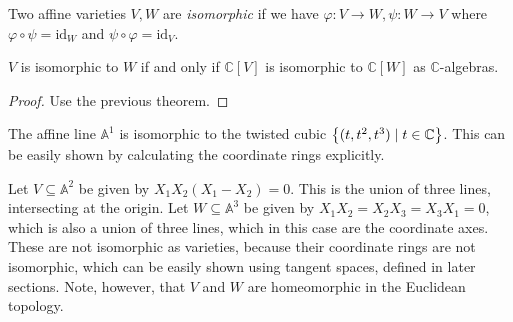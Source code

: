 \begin{definition}
    Two affine varieties \( V, W \) are \emph{isomorphic} if we have \( \varphi \colon V \to W, \psi \colon W \to V \) where \( \varphi \circ \psi = \mathrm{id}_W \) and \( \psi \circ \varphi = \mathrm{id}_V \).
\end{definition}
\begin{theorem}
    \( V \) is isomorphic to \( W \) if and only if \( \mathbb C[V] \) is isomorphic to \( \mathbb C[W] \) as \( \mathbb C \)-algebras.
\end{theorem}
\begin{proof}
    Use the previous theorem.
\end{proof}
\begin{example}
    The affine line \( \mathbb A^1 \) is isomorphic to the twisted cubic \( \qty{(t, t^2, t^3) \mid t \in \mathbb C} \).
    This can be easily shown by calculating the coordinate rings explicitly.
\end{example}
\begin{example}
    Let \( V \subseteq \mathbb A^2 \) be given by \( X_1 X_2 (X_1 - X_2) = 0 \).
    This is the union of three lines, intersecting at the origin.
    Let \( W \subseteq \mathbb A^3 \) be given by \( X_1 X_2 = X_2 X_3 = X_3 X_1 = 0 \), which is also a union of three lines, which in this case are the coordinate axes.
    These are not isomorphic as varieties, because their coordinate rings are not isomorphic, which can be easily shown using tangent spaces, defined in later sections.
    Note, however, that \( V \) and \( W \) are homeomorphic in the Euclidean topology.
\end{example}

